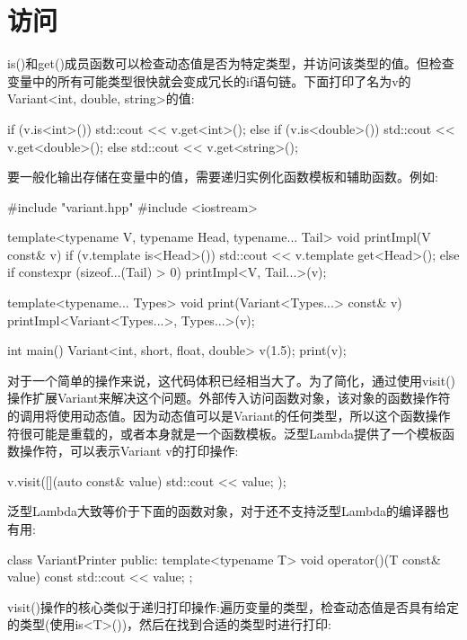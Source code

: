 \section{访问}

is()和get()成员函数可以检查动态值是否为特定类型，并访问该类型的值。但检查变量中的所有可能类型很快就会变成冗长的if语句链。下面打印了名为v的Variant<int, double, string>的值:

\begin{cpp}
if (v.is<int>()) {
	std::cout << v.get<int>();
}
else if (v.is<double>()) {
	std::cout << v.get<double>();
}
else {
	std::cout << v.get<string>();
}
\end{cpp}

要一般化输出存储在变量中的值，需要递归实例化函数模板和辅助函数。例如:

\begin{cpp}
#include "variant.hpp"
#include <iostream>

template<typename V, typename Head, typename... Tail>
void printImpl(V const& v)
{
	if (v.template is<Head>()) {
		std::cout << v.template get<Head>();
	}
	else if constexpr (sizeof...(Tail) > 0) {
		printImpl<V, Tail...>(v);
	}
}

template<typename... Types>
void print(Variant<Types...> const& v)
{
	printImpl<Variant<Types...>, Types...>(v);
}

int main() {
	Variant<int, short, float, double> v(1.5);
	print(v);
}
\end{cpp}

对于一个简单的操作来说，这代码体积已经相当大了。为了简化，通过使用visit()操作扩展Variant来解决这个问题。外部传入访问函数对象，该对象的函数操作符的调用将使用动态值。因为动态值可以是Variant的任何类型，所以这个函数操作符很可能是重载的，或者本身就是一个函数模板。泛型Lambda提供了一个模板函数操作符，可以表示Variant v的打印操作:

\begin{cpp}
v.visit([](auto const& value) {
			std::cout << value;
		});
\end{cpp}

泛型Lambda大致等价于下面的函数对象，对于还不支持泛型Lambda的编译器也有用:

\begin{cpp}
class VariantPrinter {
	public:
	template<typename T>
	void operator()(T const& value) const
	{
		std::cout << value;
	}
};
\end{cpp}

visit()操作的核心类似于递归打印操作:遍历变量的类型，检查动态值是否具有给定的类型(使用is<T>())，然后在找到合适的类型时进行打印:

